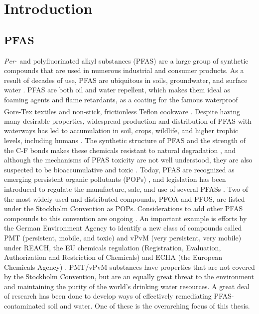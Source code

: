 \chapter{Introduction}\label{chap:intro}

\section{PFAS}
\textit{Per}- and polyfluorinated alkyl substances (PFAS) are a large group of synthetic compounds that are used in numerous industrial and consumer products. As a result of decades of use, PFAS are ubiquitous in soils, groundwater, and surface water \citep{rankin2016north}. PFAS are both oil and water repellent, which makes them ideal as foaming agents and flame retardants, as a coating for the famous waterproof Gore-Tex\textsuperscript{\textregistered} textiles and non-stick, frictionless Teflon\textsuperscript{\texttrademark} cookware \citep{du2014adsorption}. Despite having many desirable properties, widespread production and distribution of PFAS with waterways has led to accumulation in soil, crops, wildlife, and higher trophic levels, including humans \citep{bhhatarai2011,Lau2007}. The synthetic structure of PFAS and the strength of the C-F bonds makes these chemicals resistant to natural degradation \citep{krafft2015per}, and although the mechanisms of PFAS toxicity are not well understood, they are also suspected to be bioaccumulative and toxic \citep{ding2013physicochemical,Lau2007}. Today, PFAS are recognized as emerging persistent organic pollutants (POPs) \citep{ECHA2020}, and legislation has been introduced to regulate the manufacture, sale, and use of several PFASs \citep{EPA2014,EC2020PFAS,goldenman2017study}. Two of the most widely used and distributed compounds, PFOA and PFOS, are listed under the Stockholm Convention as \acrshort{POPs}. Considerations to add other PFAS compounds to this convention are ongoing \citep{EC2020PFAS}. An important example is efforts by the German Environment Agency to identify a new class of compounds called PMT (persistent, mobile, and toxic) and vPvM (very persistent, very mobile) under REACH, the EU chemicals regulation (Registration, Evaluation, Authorization and Restriction of Chemicals) and ECHA (the European Chemicals Agency) \citep{hale2020persistent}. \acrshort{PMT}/\acrshort{vPvM} substances have properties that are not covered by the Stockholm Convention, but are an equally great threat to the environment and maintaining the purity of the world's drinking water resources. A great deal of research has been done to develop ways of effectively remediating PFAS-contaminated soil and water. One of these is the overarching focus of this thesis. 

